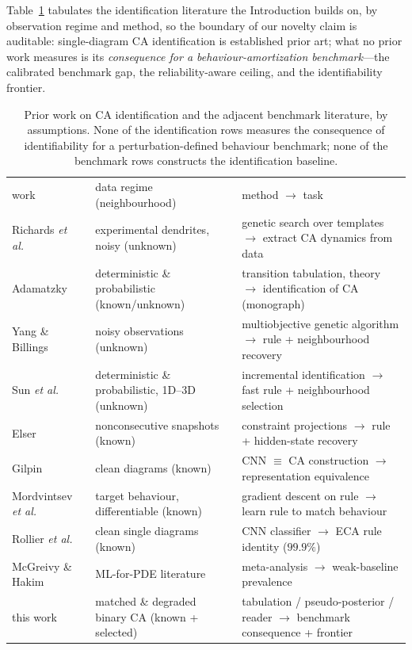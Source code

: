 \documentclass[aip,cha,amsmath,amssymb,reprint,floatfix]{revtex4-2}
\begin{document}
Table~\ref{tab:priorwork} tabulates the identification literature the
Introduction builds on, by observation regime and method, so the boundary of
our novelty claim is auditable: single-diagram CA identification is
established prior art; what no prior work measures is its \emph{consequence
for a behaviour-amortization benchmark}---the calibrated benchmark gap,
the reliability-aware ceiling, and the identifiability frontier.

\begin{table}[b]
\centering
\scriptsize
\begin{ruledtabular}
\begin{tabular}{p{}p{}p{}}
work & data regime (neighbourhood) & method $\rightarrow$ task \\
\colrule
Richards \emph{et al.}~\cite{richards1990} & experimental dendrites, noisy (unknown) & genetic search over templates $\rightarrow$ extract CA dynamics from data \\
Adamatzky~\cite{adamatzky1994} & deterministic \& probabilistic (known/unknown) & transition tabulation, theory $\rightarrow$ identification of CA (monograph) \\
Yang \& Billings~\cite{yangbillings2000} & noisy observations (unknown) & multiobjective genetic algorithm $\rightarrow$ rule + neighbourhood recovery \\
Sun \emph{et al.}~\cite{sunrosinmartin2011} & deterministic \& probabilistic, 1D--3D (unknown) & incremental identification $\rightarrow$ fast rule + neighbourhood selection \\
Elser~\cite{elser2021} & nonconsecutive snapshots (known) & constraint projections $\rightarrow$ rule + hidden-state recovery \\
Gilpin~\cite{gilpin2019} & clean diagrams (known) & CNN $\equiv$ CA construction $\rightarrow$ representation equivalence \\
Mordvintsev \emph{et al.}~\cite{mordvintsev2020} & target behaviour, differentiable (known) & gradient descent on rule $\rightarrow$ learn rule to match behaviour \\
Rollier \emph{et al.}~\cite{rollier2024cnn} & clean single diagrams (known) & CNN classifier $\rightarrow$ ECA rule identity ($99.9\%$) \\
McGreivy \& Hakim~\cite{mcgreivy2024} & ML-for-PDE literature & meta-analysis $\rightarrow$ weak-baseline prevalence \\
this work & matched \& degraded binary CA (known + selected) & tabulation / pseudo-posterior / reader $\rightarrow$ benchmark consequence + frontier \\
\end{tabular}
\end{ruledtabular}
\caption{Prior work on CA identification and the adjacent benchmark
literature, by assumptions. None of the identification rows measures the
consequence of identifiability for a perturbation-defined behaviour
benchmark; none of the benchmark rows constructs the identification
baseline.}
\label{tab:priorwork}
\end{table}
\end{document}
